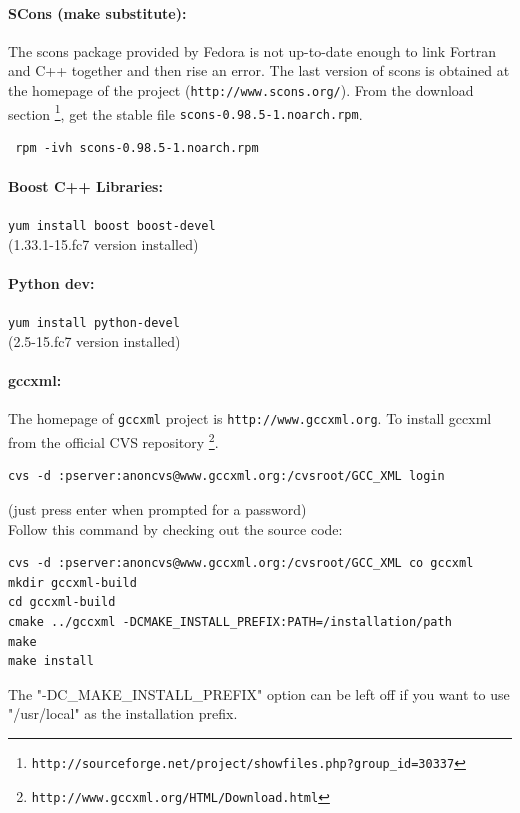\documentclass[12pt,a4paper]{article}
\begin{document}
\paragraph{SCons (make substitute):}
The scons package provided by Fedora is not up-to-date enough to link Fortran and C++ together and then rise an
error. The last version of scons is obtained at the homepage of the project ({\tt  http://www.scons.org/}).
From the download section \footnote{\tt http://sourceforge.net/project/showfiles.php?group\_id=30337}, 
get the stable file {\tt scons-0.98.5-1.noarch.rpm}.

\begin{verbatim}
 rpm -ivh scons-0.98.5-1.noarch.rpm
\end{verbatim}

\paragraph{Boost C++ Libraries:} {\tt yum install boost boost-devel} \\
(1.33.1-15.fc7 version installed)

\paragraph{Python dev:} {\tt yum install python-devel} \\
(2.5-15.fc7 version installed)

\paragraph{gccxml:}The homepage of {\tt gccxml} project is {\tt http://www.gccxml.org}. 
To install gccxml from the official CVS repository \footnote{\tt http://www.gccxml.org/HTML/Download.html}.

\begin{verbatim}
cvs -d :pserver:anoncvs@www.gccxml.org:/cvsroot/GCC_XML login
\end{verbatim}
(just press enter when prompted for a password)\\
Follow this command by checking out the source code:
\begin{verbatim}
cvs -d :pserver:anoncvs@www.gccxml.org:/cvsroot/GCC_XML co gccxml
mkdir gccxml-build
cd gccxml-build
cmake ../gccxml -DCMAKE_INSTALL_PREFIX:PATH=/installation/path
make
make install
\end{verbatim}
The "-DC\_MAKE\_INSTALL\_PREFIX" option can be left off if you want to use "/usr/local" as the installation prefix.
\end{document}
